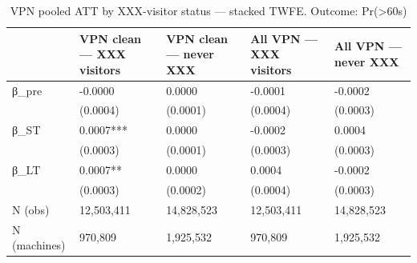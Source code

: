 \begin{table}

\caption{VPN pooled ATT by XXX-visitor status — stacked TWFE. Outcome: Pr(>60s)}
\centering
\begin{tabular}[t]{lllll}
\toprule
  & VPN clean — XXX visitors & VPN clean — never XXX & All VPN — XXX visitors & All VPN — never XXX\\
\midrule
β\_pre & -0.0000 & 0.0000 & -0.0001 & -0.0002\\
 & (0.0004) & (0.0001) & (0.0004) & (0.0003)\\
β\_ST & 0.0007*** & 0.0000 & -0.0002 & 0.0004\\
 & (0.0003) & (0.0001) & (0.0003) & (0.0003)\\
β\_LT & 0.0007** & 0.0000 & 0.0004 & -0.0002\\
\addlinespace
 & (0.0003) & (0.0002) & (0.0004) & (0.0003)\\
N (obs) & 12,503,411 & 14,828,523 & 12,503,411 & 14,828,523\\
N (machines) & 970,809 & 1,925,532 & 970,809 & 1,925,532\\
\bottomrule
\end{tabular}
\end{table}

